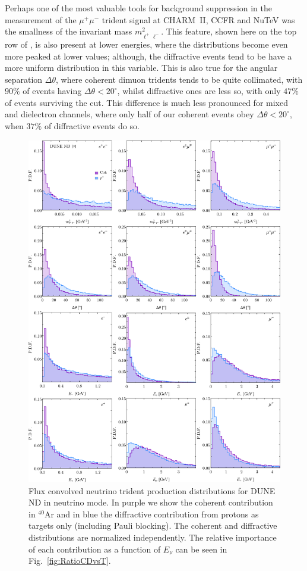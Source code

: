 Perhaps one of the most valuable tools for background suppression in the measurement of the $\mu^+\mu^-$ trident signal at CHARM~II, CCFR and NuTeV \cite{Geiregat:1990gz,Mishra:1991bv,Adams:1998yf} was the smallness of the invariant mass $m^2_{\ell^+ \ell^-}$. This feature, shown here on the top row of , is also present at lower energies, where the distributions become even more peaked at lower values; although, the diffractive events tend to be have a more uniform distribution in this variable. This is also true for the angular separation $\Delta \theta$, where coherent dimuon tridents tends to be quite collimated, with $90\%$ of events having $\Delta \theta < 20^\circ$, whilst diffractive ones are less so, with only $47\%$ of events surviving the cut. This difference is much less pronounced for mixed and dielectron channels, where only half of our coherent events obey $\Delta \theta < 20^\circ$, when $37\%$ of diffractive events do so.

%
\begin{figure}[H]
\centering
\includegraphics[width=\textwidth]{figs/DUNE_nu_3horn_mll_theta_E.pdf}
\caption{Flux convolved neutrino trident production distributions for DUNE ND in neutrino mode. In purple we show the coherent contribution in $^{40}$Ar and in blue the diffractive contribution from protons as targets only (including Pauli blocking). The coherent and diffractive distributions are normalized independently. The relative importance of each contribution as a function of $E_\nu$
can be seen in Fig.~\ref{fig:RatioCDvsT}.
%
\label{fig:DUNE_ND_dist}}
\end{figure}
%


